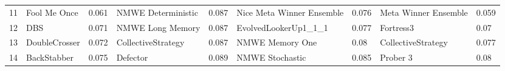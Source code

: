 \begin{tabular}{lllllllll}
11 &             Fool Me Once &     0.061 &         NMWE Deterministic &     0.087 &  Nice Meta Winner Ensemble &     0.076 &       Meta Winner Ensemble &     0.059 \\
12 &                      DBS &     0.071 &           NMWE Long Memory &     0.087 &       EvolvedLookerUp1\_1\_1 &     0.077 &                  Fortress3 &      0.07 \\
13 &            DoubleCrosser &     0.072 &         CollectiveStrategy &     0.087 &            NMWE Memory One &      0.08 &         CollectiveStrategy &     0.077 \\
14 &              BackStabber &     0.075 &                   Defector &     0.089 &            NMWE Stochastic &     0.085 &                   Prober 3 &      0.08 \\
\bottomrule
\end{tabular}

